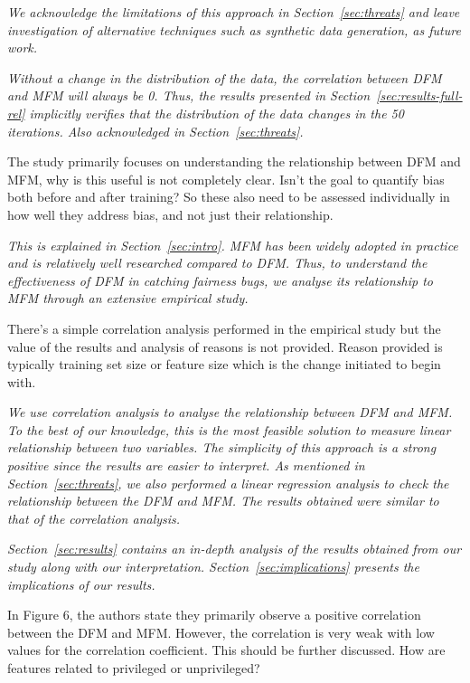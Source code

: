\documentclass[conference]{IEEEtran}
\newcommand{\highlight}[1]{\begin{framed}%
  \noindent\emph{#1}
\end{framed}}
\begin{document}
\highlight{We acknowledge the limitations of this approach in
Section~\ref{sec:threats} and leave investigation of alternative
techniques such as synthetic data generation, as future work.}

\highlight{Without a change in the distribution of the data, the
correlation between DFM and MFM will always be 0. Thus, the
results presented in Section~\ref{sec:results-full-rel} implicitly
verifies that the distribution of the data changes in the 50
iterations. Also acknowledged in Section~\ref{sec:threats}.}

The study primarily focuses on understanding the relationship between
DFM and MFM, why is this useful is not completely clear. Isn't the
goal to quantify bias both before and after training? So these also
need to be assessed individually in how well they address bias, and
not just their relationship. 

\highlight{This is explained in Section~\ref{sec:intro}. MFM has been
widely adopted in practice and is relatively well researched compared
to DFM. Thus, to understand the effectiveness of DFM in catching
fairness bugs, we analyse its relationship to MFM through an extensive
empirical study.}

There's a simple correlation analysis performed in the empirical study
but the value of the results and analysis of reasons is not
provided. Reason provided is typically training set size or feature
size which is the change initiated to begin with.

\highlight{We use correlation analysis to analyse the relationship
between DFM and MFM. To the best of our knowledge, this is the most
feasible solution to measure linear relationship between two
variables. The simplicity of this approach is a strong positive since
the results are easier to interpret. As mentioned in
Section~\ref{sec:threats}, we also performed a linear regression
analysis to check the relationship between the DFM and MFM. The
results obtained were similar to that of the correlation analysis.}

\highlight{Section~\ref{sec:results} contains an in-depth analysis of
the results obtained from our study along with our
interpretation. Section~\ref{sec:implications} presents the
implications of our results.}

In Figure 6, the authors state they primarily observe a positive
correlation between the DFM and MFM. However, the correlation is very
weak with low values for the correlation coefficient. This should be
further discussed. How are features related to privileged or
unprivileged?
\end{document}
